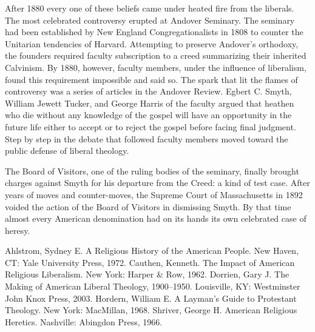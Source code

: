 After 1880 every one of these beliefs came under heated fire from the liberals. The most celebrated
controversy erupted at Andover Seminary. The seminary had been established by New England
Congregationalists in 1808 to counter the Unitarian tendencies of Harvard. Attempting to preserve
Andover’s orthodoxy, the founders required faculty subscription to a creed summarizing their
inherited Calvinism. By 1880, however, faculty members, under the influence of liberalism, found
this requirement impossible and said so. The spark that lit the flames of controversy was a series
of articles in the Andover Review. Egbert C. Smyth, William Jewett Tucker, and George Harris of the
faculty argued that heathen who die without any knowledge of the gospel will have an opportunity in
the future life either to accept or to reject the gospel before facing final judgment. Step by step
in the debate that followed faculty members moved toward the public defense of liberal theology.

The Board of Visitors, one of the ruling bodies of the seminary, finally brought charges against
Smyth for his departure from the Creed: a kind of test case. After years of moves and counter-moves,
the Supreme Court of Massachusetts in 1892 voided the action of the Board of Visitors in dismissing
Smyth. By that time almost every American denomination had on its hands its own celebrated case of
heresy.

\begin{readinglist}
\entry Ahlstrom, Sydney E. A Religious History of the American People. New Haven, CT: Yale
  University Press, 1972.
\entry Cauthen, Kenneth. The Impact of American Religious Liberalism. New York: Harper \& Row, 1962.
\entry Dorrien, Gary J. The Making of American Liberal Theology, 1900–1950. Louisville, KY:
  Westminster John Knox Press, 2003.
\entry Hordern, William E. A Layman’s Guide to Protestant Theology. New York: MacMillan, 1968.
\entry Shriver, George H. American Religious Heretics. Nashville: Abingdon Press, 1966.
\end{readinglist}
